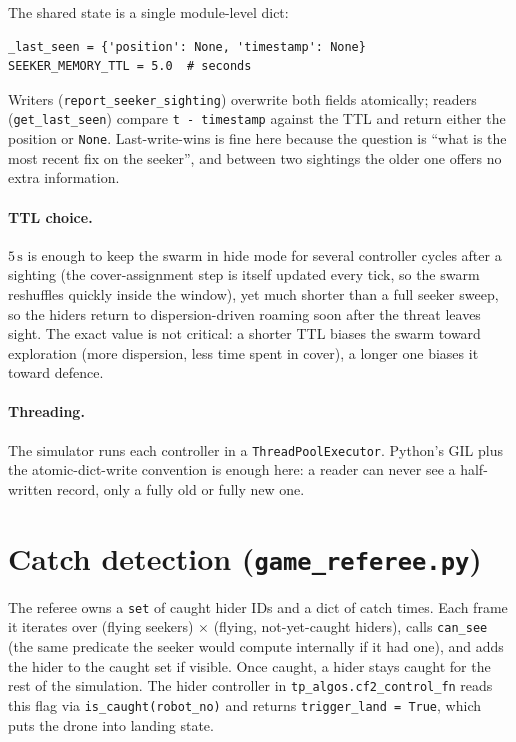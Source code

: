 \documentclass[11pt,a4paper]{article}
\newcommand{\code}[1]{\texttt{#1}}
\begin{document}
The shared state is a single module-level dict:
\begin{lstlisting}
_last_seen = {'position': None, 'timestamp': None}
SEEKER_MEMORY_TTL = 5.0  # seconds
\end{lstlisting}
Writers (\code{report\_seeker\_sighting}) overwrite both fields atomically;
readers (\code{get\_last\_seen}) compare \code{t - timestamp} against the TTL
and return either the position or \code{None}. Last-write-wins is fine here
because the question is ``what is the most recent fix on the seeker'', and
between two sightings the older one offers no extra information.

\paragraph{TTL choice.}
$5\,\text{s}$ is enough to keep the swarm in hide mode for several controller
cycles after a sighting (the cover-assignment step is itself updated every
tick, so the swarm reshuffles quickly inside the window), yet much shorter
than a full seeker sweep, so the hiders return to dispersion-driven roaming
soon after the threat leaves sight. The exact value is not critical: a
shorter TTL biases the swarm toward exploration (more dispersion, less time
spent in cover), a longer one biases it toward defence.

\paragraph{Threading.}
The simulator runs each controller in a \code{ThreadPoolExecutor}. Python's
GIL plus the atomic-dict-write convention is enough here: a reader can never
see a half-written record, only a fully old or fully new one.

\section{Catch detection (\code{game\_referee.py})}

The referee owns a \code{set} of caught hider IDs and a dict of catch times.
Each frame it iterates over (flying seekers) $\times$ (flying, not-yet-caught
hiders), calls \code{can\_see} (the same predicate the seeker would compute
internally if it had one), and adds the hider to the caught set if visible.
Once caught, a hider stays caught for the rest of the simulation. The
hider controller in \code{tp\_algos.cf2\_control\_fn} reads this flag via
\code{is\_caught(robot\_no)} and returns \code{trigger\_land = True}, which
puts the drone into landing state.
\end{document}
